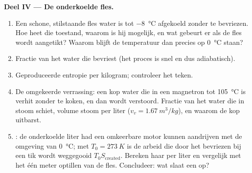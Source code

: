\begin{problem}
\medskip
\noindent\textbf{Deel IV --- De onderkoelde fles.}
\begin{enumerate}[resume]
  \item Een schone, stilstaande fles water is tot \qty{-8}{\degreeCelsius} afgekoeld
        zonder te bevriezen. Hoe heet die toestand, waarom is hij mogelijk,
        en wat gebeurt er als de fles wordt aangetikt? Waarom blijft de
        temperatuur dan precies op \qty{0}{\degreeCelsius} staan?
  \item Fractie van het water die bevriest (het proces is snel en dus
        adiabatisch).
  \item Geproduceerde entropie per kilogram; controleer het teken.
  \item De omgekeerde verrassing: een kop water die in een magnetron tot
        \qty{105}{\degreeCelsius} is verhit zonder te koken, en dan wordt verstoord. Fractie
        van het water die in stoom schiet, volume stoom per
        liter ($v_v = \qty{1.67}{m^3/kg}$), en waarom de kop uitbarst.
  \item {}: de onderkoelde liter had een omkeerbare motor kunnen
        aandrijven met de omgeving van \qty{0}{\degreeCelsius}; met
        $T_0 = \qty{273}{K}$ is de arbeid die door het bevriezen bij een tik wordt
        weggegooid $T_0S_{\mathrm{created}}$. Bereken haar per liter en
        vergelijk met het één meter optillen van de fles. Concludeer: wat slaat
        een  op?
\end{enumerate}
\end{problem}
